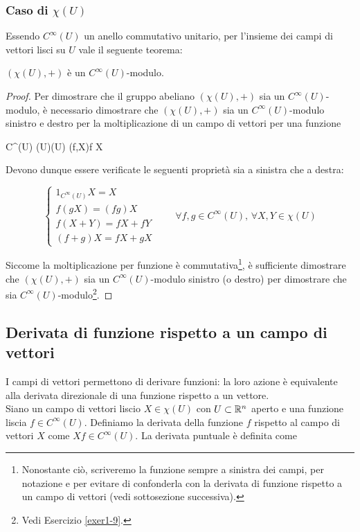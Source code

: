 \subsubsection{Caso di $ \chi(U) $}

Essendo $ C^{\infty}(U) $ un anello commutativo unitario, per l'insieme dei campi di vettori lisci su $ U $ vale il seguente teorema:

\begin{theorem}\label{thm:chi-mod}
	$ (\chi(U),+) $ è un $ C^{\infty}(U) $-modulo.
\end{theorem}

\begin{proof}
	Per dimostrare che il gruppo abeliano $ (\chi(U),+) $ sia un $ C^{\infty}(U) $-modulo, è necessario dimostrare che $ (\chi(U),+) $ sia un $ C^{\infty}(U) $-modulo sinistro e destro per la moltiplicazione di un campo di vettori per una funzione
	
	\map{\cdot}
		{C^{\infty}(U) \times \chi(U)}{\chi(U)}
		{(f,X)}{f X}
	
	Devono dunque essere verificate le seguenti proprietà sia a sinistra che a destra:

	\begin{equation}
		\begin{cases}
			1_{C^{\infty}(U)} X = X \\
			f (g X) = (f g) X \\
			f (X+Y) = f X + f Y \\
			(f+g) X = f X + g X
		\end{cases} %
		\qquad \forall f,g \in C^{\infty}(U), \, \forall X,Y \in \chi(U)
	\end{equation}

	Siccome la moltiplicazione per funzione è commutativa\footnote{%
		Nonostante ciò, scriveremo la funzione sempre a sinistra dei campi, per notazione e per evitare di confonderla con la derivata di funzione rispetto a un campo di vettori (vedi sottosezione successiva).%
	}, è sufficiente dimostrare che $ (\chi(U),+) $ sia un $ C^{\infty}(U) $-modulo sinistro (o destro) per dimostrare che sia $ C^{\infty}(U) $-modulo\footnote{%
		Vedi Esercizio \ref{exer1-9}.%
	}.
\end{proof}

\subsection{Derivata di funzione rispetto a un campo di vettori}

I campi di vettori permettono di derivare funzioni: la loro azione è equivalente alla derivata direzionale di una funzione rispetto a un vettore. \\
Siano un campo di vettori liscio $ X \in \chi(U) $ con $ U \subset \mathbb{R}^{n} $ aperto e una funzione liscia $ f \in C^{\infty}(U) $. Definiamo la derivata della funzione $ f $ rispetto al campo di vettori $ X $ come $ X f \in C^{\infty}(U) $. La derivata puntuale è definita come

